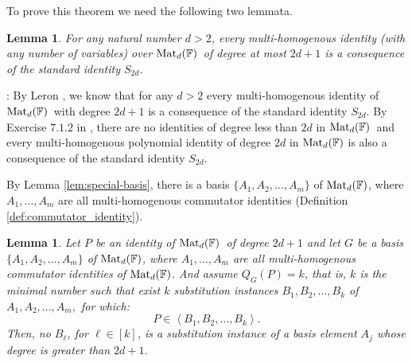 \documentclass[12pt,reqno]{article}
\newtheorem{lemma}[theorem]{Lemma}
\newcommand\F{\ensuremath{\mathbb F}}
\renewcommand{\l}{\ell}
\newcommand{\matd}{{\ensuremath{{\rm Mat}_d(\F)}}}
\newenvironment{proof}{\QuadSpace\par\noindent{\bf Proof}:}{\EndProof\HalfSpace}
\newcommand{\QuadSpace}{\vspace{0.25\baselineskip}}
\newcommand{\HalfSpace}{\vspace{0.5\baselineskip}}
\newcommand{\EndProof}{ \hfill \vrule width 1ex height 1ex depth 0pt }
\renewcommand{\t}[1]{\overline{#1}}
\newcommand{\ideal}[1]{\ensuremath{\left\langle #1\right\rangle}}
\begin{document}
To prove this theorem we need
the following two lemmata.
\begin{lemma}\label{lem:generated-by-S_2d}
For any natural number $d>2$, every multi-homogenous identity  (with any number of variables) over \matd\ of degree at most $2d+1$ is a consequence of the standard identity $S_{2d}$.
\end{lemma}
\begin{proof}
By Leron \cite{Ler73}, we know that  for any  $d>2$ every multi-homogenous identity of \matd\ with degree $2d+1$  is a consequence of the standard identity $S_{2d}$. By Exercise $7.1.2$ in  \cite{Dre99}, there are no identities of degree less than $2d$ in \matd\ and  every multi-homogenous polynomial identity of degree $2d$  in  $\matd$ is also a consequence of the standard identity $S_{2d}$.
\end{proof}

By Lemma \ref{lem:special-basis}, there is a basis  $\{A_1,A_2,\ldots,A_{m}\}$ of $\matd$, where $A_1,\ldots,A_m$ are all multi-homogenous commutator identities (Definition \ref{def:commutator_identity}).

\begin{lemma}\label{lem:2d+2-cant-generate}
Let $P$  be an identity of \matd\ of degree $2d+1$ and let $G$ be a basis  $\{A_1,A_2,\ldots,A_m\}$ of $\matd$, where $A_1,\ldots,A_m$ are all multi-homogenous  commutator identities of \matd. And assume $Q_{G}(P)=k$, that is, $k$ is the minimal number such that exist $k$ substitution instances $B_1,B_2,\ldots,B_k$ of $A_1,A_2,\ldots,A_m,$ for which:
$$P\in \ideal{B_1,B_2,\ldots,B_k}.$$
Then, no $B_\l$, for $\l\in[k]$, is a substitution instance of a basis element $A_j$ whose degree  is  greater than $2d+1$.
\end{lemma}
\end{document}
